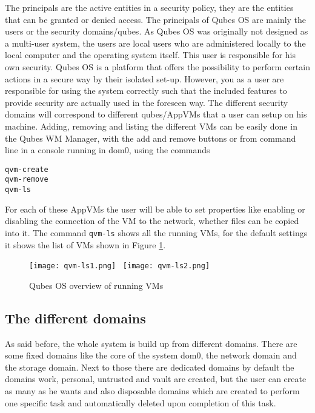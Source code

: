 \documentclass[runningheads,a4paper]{article}
\begin{document}
The principals are the active entities in a security policy, they are
the entities that can be granted or denied access. The principals of
Qubes OS are mainly the users or the security domains/qubes.
As Qubes OS was originally not designed
as a multi-user system, the users are local users who are administered
locally to the local computer and the operating system itself. This
user is responsible for his own security. Qubes OS is a platform that
offers the possibility to perform certain actions in a secure way by
their isolated set-up. However, you as a user are responsible for
using the system correctly such that the included features to
provide security are actually used in the foreseen way. The different
security domains will correspond to different qubes/AppVMs that a user
can setup on his machine. Adding, removing and listing the different
VMs can be easily done in the Qubes WM Manager, with the add and
remove buttons or from command line in a console running in dom0,
using the commands
\begin{verbatim}
qvm-create
qvm-remove
qvm-ls
\end{verbatim}
For each of these AppVMs the user will be able to set properties like
enabling or disabling the connection of the VM to the network, whether
files can be copied into it. 
The command \texttt{qvm-ls} shows all the running VMs, for the default settings it shows the list of VMs shown in Figure \ref{fig:qvm-ls}.

\begin{figure}[h]
  \centering
  \texttt{[image: qvm-ls1.png]}~
  \texttt{[image: qvm-ls2.png]}
  \caption{Qubes OS overview of running VMs\\}
  \label{fig:qvm-ls}
\end{figure}

\subsection{The different domains}
As said before, the whole system is build up from different
domains. There are some fixed domains like the core of the system
dom0, the network domain and the storage domain. Next to those there
are dedicated domains by default the domains work, personal,
untrusted and vault are created, but the user can create as many as he wants and
also disposable domains which are created to perform one specific task
and automatically deleted upon completion of this task.
\end{document}
